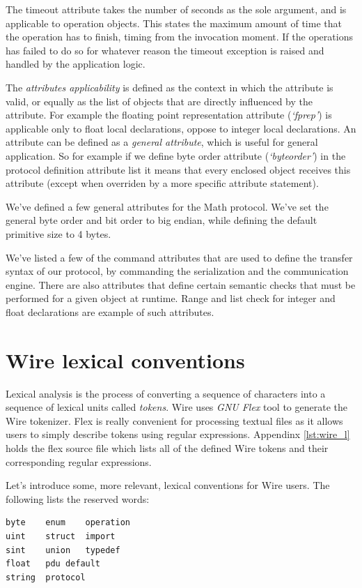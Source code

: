 \documentclass[times, utf8, diplomski]{fer}
\begin{document}
The timeout attribute takes the number of seconds as the sole argument, and is 
applicable to operation objects. This states the maximum amount of time that the 
operation has to finish, timing from the invocation moment. If the operations has 
failed to do so for whatever reason the timeout exception is raised and handled 
by the application logic.

The \emph{attributes applicability} is defined as the context in which the attribute 
is valid, or equally as the list of objects that are directly influenced by the 
attribute. For example the floating point representation attribute (\emph{`fp\textunderscore{}rep'})
 is applicable only to float local declarations, oppose to integer local declarations. 
An attribute can be defined as a \emph{general attribute}, which is useful for 
general application. So for example if we define byte order attribute 
(\emph{`byte\textunderscore{}order'}) in the protocol definition attribute list it means that 
every enclosed object receives this attribute (except when overriden by a more 
specific attribute statement).

We've defined a few general attributes for the Math protocol. We've set the 
general byte order and bit order to big endian, while defining the default 
primitive size to 4 bytes.

We've listed a few of the command attributes that are used to define the transfer 
syntax of our protocol, by commanding the serialization and the communication engine. 
There are also attributes that define certain semantic checks that must be performed 
for a given object at runtime. Range and list check for integer and float 
declarations are example of such attributes. 

\section{Wire lexical conventions}
Lexical analysis is the process of converting a sequence of characters into a 
sequence of lexical units called \emph{tokens}. Wire uses \emph{GNU Flex} tool 
to generate the Wire tokenizer. Flex is really convenient for processing textual 
files as it allows users to simply describe tokens using regular expressions. 
Appendinx \ref{lst:wire_l} holds the flex source file which lists all of the defined 
Wire tokens and their corresponding regular expressions.

Let's introduce some, more relevant, lexical conventions for Wire users. The 
following lists the reserved words:
\lstset{language=IDL}
\lstset{basicstyle=\footnotesize}
\lstset{numbers=left, numberstyle=\tiny, stepnumber=1, numbersep=5pt}
\begin{lstlisting}[frame=tb]
byte	enum	operation
uint	struct	import
sint	union	typedef
float	pdu	default
string	protocol
\end{lstlisting}
\end{document}
